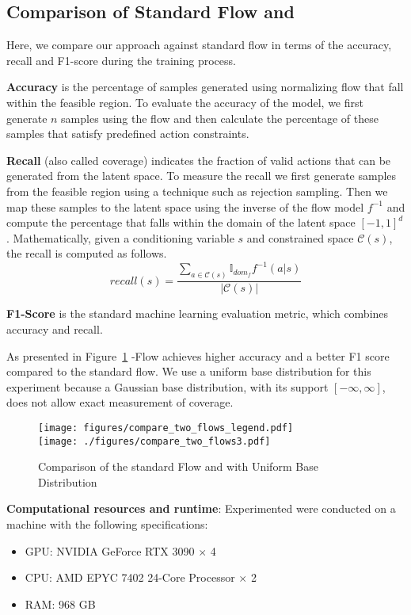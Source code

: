 \subsection{Comparison of Standard Flow and \our}
Here, we compare our approach against standard flow in terms of  the accuracy, recall and F1-score during the training process. 

\noindent\textbf{Accuracy} is the percentage of samples generated using normalizing flow that fall within the feasible region. To evaluate the accuracy of the model, we first generate $n$ samples using the flow and then calculate the percentage of these samples that satisfy predefined action constraints. 

\noindent\textbf{Recall} (also called coverage) indicates the fraction of valid actions that can be generated from the latent space. To measure the recall we first generate samples from the feasible region using a technique such as rejection sampling. Then we map these samples to the latent space using the inverse of the flow model $f^{-1}$ and compute the percentage that falls within the domain of the latent space $[-1, 1]^d$. Mathematically, given a conditioning variable $s$ and constrained space $\mathcal{C}(s)$, the recall is computed as follows. 
{
\begin{equation} \label{eq:recall}
recall(s) = \frac{\sum_{a \in \mathcal{C}(s)} \mathbb{I}_{dom_f}f^{-1}(a|s)}{|\mathcal{C}(s)|}
\end{equation}}

\noindent\textbf{F1-Score} is the standard machine
learning evaluation metric, which combines accuracy and recall.

\noindent As presented in Figure~\ref{fig:compare-flow} \ourcv-Flow achieves higher accuracy and a better F1 score compared to the standard flow. We use a uniform base distribution for this experiment because a Gaussian base distribution, with its support $[-\infty, \infty]$, does not allow exact measurement of coverage.



\begin{figure}[b]
  \centering	
  \texttt{[image: figures/compare\_two\_flows\_legend.pdf]}\\
  \texttt{[image: ./figures/compare\_two\_flows3.pdf]}
  \caption{Comparison of the standard Flow and {\our} with Uniform Base Distribution}
  \label{fig:compare-flow}
\end{figure}

\noindent \textbf{Computational resources and runtime}: Experimented were conducted on a machine with the following specifications:
\begin{itemize}
\item GPU: NVIDIA GeForce RTX 3090 $\times$ 4
\item CPU: AMD EPYC 7402 24-Core Processor $\times$ 2
\item RAM: 968 GB
\end{itemize}


